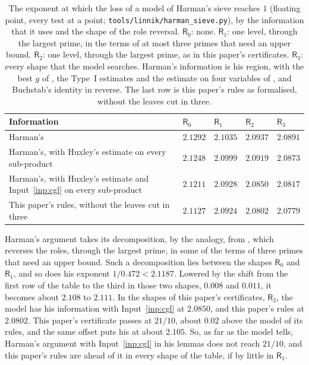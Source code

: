 \documentclass[11pt]{article}
\theoremstyle{definition}
\newcommand{\file}[1]{\nolinkurl{#1}}
\begin{document}
\begin{table}[t]
\centering
\small
\caption{The exponent at which the loss of a model of Harman's sieve reaches $1$ (floating point, every test at a
point; \file{tools/linnik/harman\_sieve.py}), by the information that it uses and the shape of the role reversal.
$\mathsf R_0$: none. $\mathsf R_1$: one level, through the largest prime, in the terms of at most three primes that
need an upper bound. $\mathsf R_2$: one level, through the largest prime, as in this paper's certificates.
$\mathsf R_3$: every shape that the model searches. Harman's information is his region, with the best $g$ of
\cite{bhp}, the Type~I estimates and the estimate on four variables of \cite{hkl}, and Buchstab's identity in
reverse. The last row is this paper's rules as formalised, without the leaves cut in three.}
\label{tab:harman-cgl}
\vspace{3pt}
\begin{tabular}{@{}>{\raggedright\arraybackslash}p{}llll@{}}
\toprule
Information & $\mathsf R_0$ & $\mathsf R_1$ & $\mathsf R_2$ & $\mathsf R_3$ \\
\midrule
Harman's & $2.1292$ & $2.1035$ & $2.0937$ & $2.0891$ \\
Harman's, with Huxley's estimate on every sub-product & $2.1248$ & $2.0999$ & $2.0919$ & $2.0873$ \\
Harman's, with Huxley's estimate and Input~\ref{inp:cgl} on every sub-product & $2.1211$ & $2.0928$ & $2.0850$ &
  $2.0817$ \\
This paper's rules, without the leaves cut in three & $2.1127$ & $2.0924$ & $2.0802$ & $2.0779$ \\
\bottomrule
\end{tabular}
\end{table}

Harman's argument takes its decomposition, by the analogy, from \cite{hkl}, which reverses the roles, through the
largest prime, in some of the terms of three primes that need an upper bound. Such a decomposition lies between the
shapes $\mathsf R_0$ and $\mathsf R_1$, and so does his exponent $1/0.472 < 2.1187$. Lowered by the shift from the
first row of the table to the third in those two shapes, $0.008$ and $0.011$, it becomes about $2.108$ to $2.111$. In
the shapes of this paper's certificates, $\mathsf R_2$, the model has his information with Input~\ref{inp:cgl} at
$2.0850$, and this paper's rules at $2.0802$. This paper's certificate passes at $21/10$, about $0.02$ above the
model of its rules, and the same offset puts his at about $2.105$. So, as far as the model tells, Harman's argument
with Input~\ref{inp:cgl} in his lemmas does not reach $21/10$, and this paper's rules are ahead of it in every shape
of the table, if by little in $\mathsf R_1$.
\end{document}
